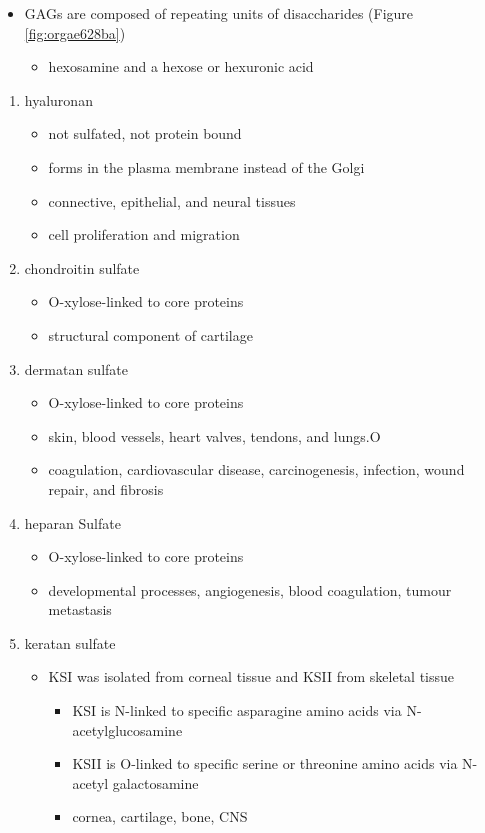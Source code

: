 \documentclass{scrartcl}
\begin{document}
\begin{itemize}
\item GAGs are composed of repeating units of disaccharides (Figure \ref{fig:orgae628ba})
\begin{itemize}
\item hexosamine and a hexose or hexuronic acid
\end{itemize}
\end{itemize}
\begin{enumerate}
\item hyaluronan
\label{sec:org84fe9b5}
\begin{itemize}
\item not sulfated, not protein bound
\item forms in the plasma membrane instead of the Golgi
\item connective, epithelial, and neural tissues
\item cell proliferation and migration
\end{itemize}

\item chondroitin sulfate
\label{sec:orgdc06038}
\begin{itemize}
\item O-xylose-linked to core proteins
\item structural component of cartilage
\end{itemize}

\item dermatan sulfate
\label{sec:org50847dd}
\begin{itemize}
\item O-xylose-linked to core proteins
\item skin, blood vessels, heart valves, tendons, and lungs.O
\item coagulation, cardiovascular disease, carcinogenesis, infection, wound repair, and fibrosis
\end{itemize}

\item heparan Sulfate
\label{sec:orga0f985c}
\begin{itemize}
\item O-xylose-linked to core proteins
\item developmental processes, angiogenesis, blood coagulation, tumour metastasis
\end{itemize}

\item keratan sulfate
\label{sec:orgf10fcca}
\begin{itemize}
\item KSI was isolated from corneal tissue and KSII from skeletal tissue
\begin{itemize}
\item KSI is N-linked to specific asparagine amino acids via
N-acetylglucosamine
\item KSII is O-linked to specific serine or threonine amino acids via
N-acetyl galactosamine
\item cornea, cartilage, bone, CNS
\end{itemize}
\end{itemize}



\end{enumerate}
\end{document}
